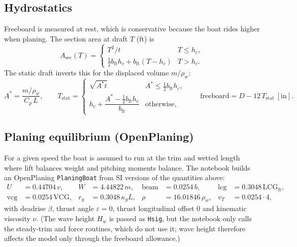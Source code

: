 \documentclass[11pt,a4paper]{article}
\renewcommand{\_}{\textunderscore\allowbreak}
\newcommand{\code}[1]{\texttt{#1}}
\newcommand{\lcg}{\mathrm{LCG}}
\newcommand{\vcg}{\mathrm{VCG}}
\begin{document}
\subsection{Hydrostatics}
Freeboard is measured at rest, which is conservative because the boat rides higher when planing.
The section area at draft $T$ (ft) is
\begin{equation}
  A_{\mathrm{sec}}(T) =
  \begin{cases}
    T^2/t & T \le h_c,\\
    \tfrac12 b_{\mathrm{ft}}h_c + b_{\mathrm{ft}}(T - h_c) & T > h_c.
  \end{cases}
  \label{eq:section}
\end{equation}
The static draft inverts this for the displaced volume $m/\rho_w$:
\begin{equation}
  A^\ast = \frac{m/\rho_w}{C_p\,L},\qquad
  T_{\mathrm{stat}} =
  \begin{cases}
    \sqrt{A^\ast t} & A^\ast \le \tfrac12 b_{\mathrm{ft}}h_c,\\[2pt]
    h_c + \dfrac{A^\ast - \tfrac12 b_{\mathrm{ft}}h_c}{b_{\mathrm{ft}}} & \text{otherwise},
  \end{cases}
  \qquad
  \text{freeboard} = D - 12\,T_{\mathrm{stat}}\ [\mathrm{in}].
  \label{eq:draft}
\end{equation}

\subsection{Planing equilibrium (OpenPlaning)}
\label{sec:planing}
For a given speed the boat is assumed to run at the trim and wetted length where lift balances weight and pitching
moments balance. The notebook builds an OpenPlaning \code{PlaningBoat} from SI versions of the quantities above:
\begin{align*}
  U &= 0.44704\,v, &
  W &= 4.44822\,m, &
  \text{beam} &= 0.0254\,b, &
  \text{lcg} &= 0.3048\,\lcg_{\mathrm{ft}},\\
  \text{vcg} &= 0.0254\,\vcg, &
  r_g &= 0.3048\,\kappa_g L, &
  \rho &= 16.01846\,\rho_w, &
  v_T &= 0.0254\cdot 4,
\end{align*}
with deadrise $\beta$, thrust angle $\varepsilon=0$, thrust longitudinal offset $0$ and kinematic viscosity $\nu$.
(The wave height $H_w$ is passed as \code{H\_sig}, but the notebook only calls the steady-trim and force routines, which do
not use it; wave height therefore affects the model only through the freeboard allowance.)
\end{document}
